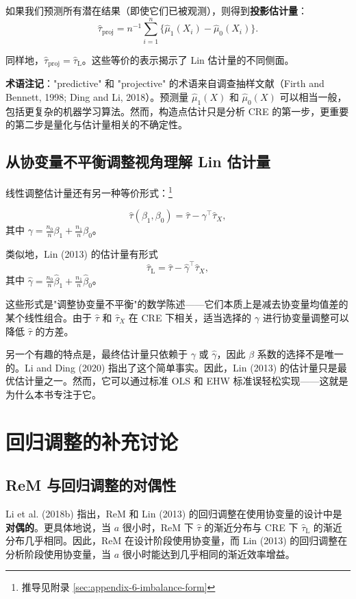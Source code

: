 如果我们预测所有潜在结果（即使它们已被观测），则得到\textbf{投影估计量}：
\[
\hat{\tau}_{\text{proj}} = n^{-1}\sum_{i=1}^n \{\hat{\mu}_1(X_i) - \hat{\mu}_0(X_i)\} .
\]

同样地，$\hat{\tau}_{\text{proj}} = \hat{\tau}_{\mathrm{L}}$。这些等价的表示揭示了 Lin 估计量的不同侧面。

\textbf{术语注记}："predictive" 和 "projective" 的术语来自调查抽样文献（Firth and Bennett, 1998; Ding and Li, 2018）。预测量 $\hat{\mu}_1(X)$ 和 $\hat{\mu}_0(X)$ 可以相当一般，包括更复杂的机器学习算法。然而，构造点估计只是分析 CRE 的第一步，更重要的第二步是量化与估计量相关的不确定性。

\subsection{从协变量不平衡调整视角理解 Lin 估计量}\label{sec:6-imbalance-view}

线性调整估计量还有另一种等价形式：\footnote{推导见附录 \cref{sec:appendix-6-imbalance-form}}

\[
\hat{\tau}(\beta_1, \beta_0) = \hat{\tau} - \gamma^\top \hat{\tau}_X ,
\]
其中 $\gamma = \frac{n_0}{n}\beta_1 + \frac{n_1}{n}\beta_0$。

类似地，Lin (2013) 的估计量有形式
\[
\hat{\tau}_{\mathrm{L}} = \hat{\tau} - \hat{\gamma}^\top \hat{\tau}_X ,
\]
其中 $\hat{\gamma} = \frac{n_0}{n}\hat{\beta}_1 + \frac{n_1}{n}\hat{\beta}_0$。

这些形式是"调整协变量不平衡"的数学陈述——它们本质上是减去协变量均值差的某个线性组合。由于 $\hat{\tau}$ 和 $\hat{\tau}_X$ 在 CRE 下相关，适当选择的 $\gamma$ 进行协变量调整可以降低 $\hat{\tau}$ 的方差。

另一个有趣的特点是，最终估计量只依赖于 $\gamma$ 或 $\hat{\gamma}$，因此 $\beta$ 系数的选择不是唯一的。Li and Ding (2020) 指出了这个简单事实。因此，Lin (2013) 的估计量只是最优估计量之一。然而，它可以通过标准 OLS 和 EHW 标准误轻松实现——这就是为什么本书专注于它。

\section{回归调整的补充讨论}\label{sec:6-additional-remarks}

\subsection{ReM 与回归调整的对偶性}\label{sec:6-duality}

Li et al. (2018b) 指出，ReM 和 Lin (2013) 的回归调整在使用协变量的设计中是\textbf{对偶的}。更具体地说，当 $a$ 很小时，ReM 下 $\hat{\tau}$ 的渐近分布与 CRE 下 $\hat{\tau}_{\mathrm{L}}$ 的渐近分布几乎相同。因此，ReM 在设计阶段使用协变量，而 Lin (2013) 的回归调整在分析阶段使用协变量，当 $a$ 很小时能达到几乎相同的渐近效率增益。

